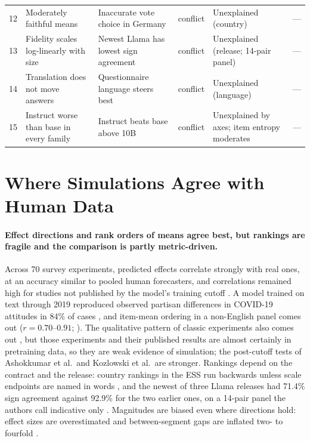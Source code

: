 \documentclass[11pt]{article}
\begin{document}
\begin{table}[!htbp]
\begin{tabular}{@{}rL{3.7cm}L{3.7cm}L{1.0cm}L{3.9cm}L{1.0cm}@{}}
12 & Moderately faithful means \citep{lam2026fast} & Inaccurate vote choice in Germany \citep{vonderheyde2025} & conflict & Unexplained (country) & --- \\
13 & Fidelity scales log-linearly with size \citep{hu2025simbench} & Newest Llama has lowest sign agreement \citep{lee2026openweight} & conflict & Unexplained (release; 14-pair panel) & --- \\
14 & Translation does not move answers \citep{durmus2023} & Questionnaire language steers best \citep{liu2025global} & conflict & Unexplained (language) & --- \\
15 & Instruct worse than base in every family \citep{jang2026} & Instruct beats base above 10B \citep{hu2025simbench} & conflict & Unexplained by axes; item entropy moderates & --- \\
\bottomrule
\end{tabular}
\end{table}

\section{Where Simulations Agree with Human Data}
\label{sec:replicate}

\paragraph{Effect directions and rank orders of means agree best, but rankings are fragile and the comparison is partly metric-driven.} Across 70 survey experiments, predicted effects correlate strongly with real ones, at an accuracy similar to pooled human forecasters, and correlations remained high for studies not published by the model's training cutoff \citep{ashokkumar2026}. A model trained on text through 2019 reproduced observed partisan differences in COVID-19 attitudes in 84\% of cases \citep{kozlowski2024}, and item-mean ordering in a non-English panel comes out ($r=0.70$--$0.91$; \citealp{kim2026korean}). The qualitative pattern of classic experiments also comes out \citep{horton2023,aher2023}, but those experiments and their published results are almost certainly in pretraining data, so they are weak evidence of simulation; the post-cutoff tests of Ashokkumar et al.\ and Kozlowski et al.\ are stronger. Rankings depend on the contract and the release: country rankings in the ESS run backwards unless scale endpoints are named in words \citep{wang2026ess}, and the newest of three Llama releases had 71.4\% sign agreement against 92.9\% for the two earlier ones, on a 14-pair panel the authors call indicative only \citep{lee2026openweight}. Magnitudes are biased even where directions hold: effect sizes are overestimated \citep{ashokkumar2026} and between-segment gaps are inflated two- to fourfold \citep{chen2026synthetic}.
\end{document}

